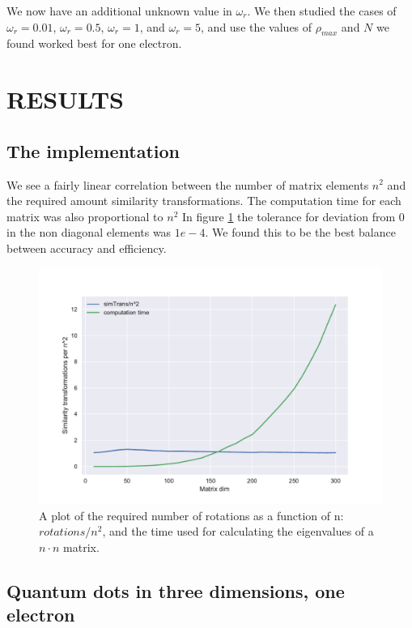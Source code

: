 \documentclass[a4paper]{article}
\begin{document}
We now have an additional unknown value in $\omega_r$. We then studied the cases of $\omega_r = 0.01$, $\omega_r = 0.5$, $\omega_r = 1$, and $\omega_r = 5$, and use the values of $\rho_{max}$ and $N$ we found worked best for one electron.


\section{RESULTS}
\subsection{The implementation}
We see a fairly linear correlation between the number of matrix elements $n^2$ and the required amount similarity transformations. The computation time for each matrix was also proportional to $n^2$ In figure \ref{computation time plot} the tolerance for deviation from 0 in the non diagonal elements was $1e-4$. We found this to be the best balance between accuracy and efficiency. 
\begin{figure}[h!]
	\centering 
	\includegraphics[scale=0.7]{../requiredRotations.pdf}
	\caption{A plot of the required number of rotations as a function of n: $rotations/n^2$, and the time used for calculating the eigenvalues of a $n\cdot n$ matrix.}
	\label{computation time plot}
\end{figure}

\subsection{Quantum dots in three dimensions, one electron}
\end{document}
